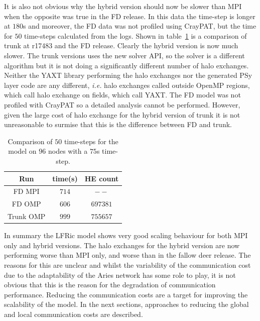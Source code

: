 It is also not obvious why the hybrid version should now be slower
than MPI when the opposite was true in the FD release. In this data
the time-step is longer at $180$s and moreover, the FD data was not
profiled using CrayPAT, but the time for $50$ time-steps calculated
from the logs. Shown in table~\ref{fig:fd_comp} is a comparison of
trunk at r17483 and the FD release. Clearly the hybrid version is now
much slower. The trunk versions uses the new solver API, so the solver
is a different algorithm but it is not doing a significantly different
number of halo exchanges. Neither the YAXT library performing the halo
exchanges nor the generated PSy layer code are any different, {\em
  i.e.} halo exchanges called outside OpenMP regions, which call halo
exchange on fields, which call YAXT. The FD model was not profiled
with CrayPAT so a detailed analysis cannot be performed. However,
given the large cost of halo exchange for the hybrid version of trunk
it is not unreasonable to surmise that this is the difference between
FD and trunk.

\begin{table}
\centering
\caption{\label{fig:fd_comp}Comparison of $50$ time-steps for the model on $96$ nodes
  with a $75$s time-step.}
\begin{tabular}{ccc}
Run & time(s) & HE count \\\hline
FD MPI & $714$ & $--$ \\
FD OMP & $606$ & $697381$ \\
Trunk OMP & $999$ & $755657$  
\end{tabular}
\end{table}

In summary the LFRic model shows very good scaling behaviour for both
MPI only and hybrid versions. The halo exchanges for the hybrid
version are now performing worse than MPI only, and worse than in the
fallow deer release. The reasons for this are unclear and whilst the
variability of the communication cost due to the adaptability of the
Aries network has some role to play, it is not obvious that this is
the reason for the degradation of communication performance. Reducing
the communication costs are a target for improving the scalability of
the model. In the next sections, approaches to reducing the global
and local communication costs are described.